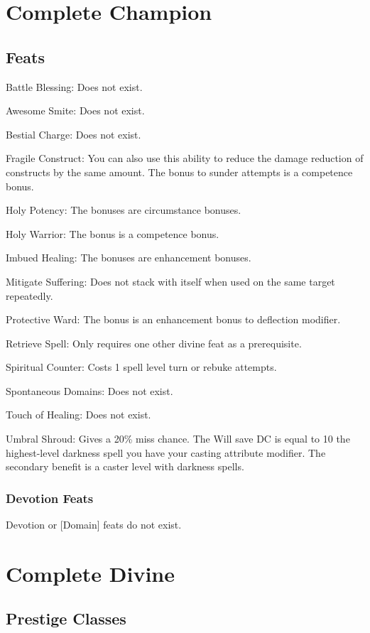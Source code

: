 \section{Complete Champion}
\subsection{Feats}
\begin{itemize*}
\item Battle Blessing: Does not exist.
\item Awesome Smite: Does not exist.
\item Bestial Charge: Does not exist.
\item Fragile Construct: You can also use this ability to reduce the damage reduction of constructs by the same amount. The bonus to sunder attempts is a competence bonus.
\item Holy Potency: The bonuses are circumstance bonuses.
\item Holy Warrior: The bonus is a competence bonus.
\item Imbued Healing: The bonuses are enhancement bonuses.
\item Mitigate Suffering: Does not stack with itself when used on the same target repeatedly.
\item Protective Ward: The bonus is an enhancement bonus to deflection modifier.
\item Retrieve Spell: Only requires one other divine feat as a prerequisite.
\item Spiritual Counter: Costs 1 \add spell level turn or rebuke attempts.
\item Spontaneous Domains: Does not exist.
\item Touch of Healing: Does not exist.
\item Umbral Shroud: Gives a 20\% miss chance. The Will save DC is equal to 10 \add the highest-level darkness spell you have \add your casting attribute modifier. The secondary benefit is a  caster level with darkness spells.
\end{itemize*}
\subsubsection{Devotion Feats}
Devotion or [Domain] feats do not exist.

\section{Complete Divine}
\subsection{Prestige Classes}
